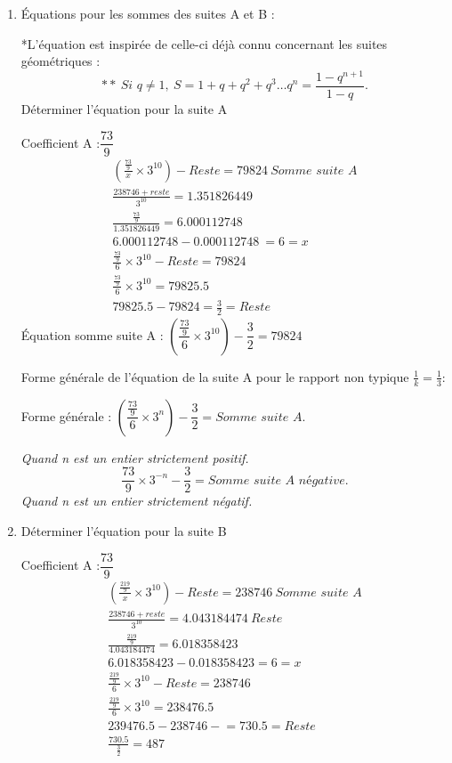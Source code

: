\documentclass[11pt,a4paper]{article}
\begin{document}
\begin{enumerate}[label=\arabic*.,leftmargin=*,itemsep=6pt]
\item Équations pour les sommes des suites A et B :

*L’équation est inspirée de celle-ci déjà connu concernant les suites géométriques :
\[
**\ \textit{Si }q\neq1,\ S=1+q+q^{2}+q^{3}\ldots q^{n}=\frac{1-q^{n+1}}{1-q}.
\]
Déterminer l’équation pour la suite A

Coefficient A :$\dfrac{73}{9}$
\begin{gather*}
\left(\frac{\frac{73}{9}}{x}\times3^{10}\right)-\textit{Reste}=79824\ \textit{Somme suite A}\\
\frac{238746+\textit{reste}}{3^{10}}=1.351826449\\
\frac{\frac{73}{9}}{1.351826449}=6.000112748\\
6.000112748-0.000112748\ =6=x\\
\frac{\frac{73}{9}}{6}\times3^{10}-\textit{Reste}=79824\\
\frac{\frac{73}{9}}{6}\times3^{10}=79825.5\\
79825.5-79824=\frac{3}{2}=\textit{Reste}
\end{gather*}
Équation somme suite A : $\left(\dfrac{\frac{73}{9}}{6}\times3^{10}\right)-\dfrac{3}{2}=79824$

Forme générale de l’équation de la suite A pour le rapport non typique $\frac{1}{k}=\frac{1}{3}$:

Forme générale : $\left(\dfrac{\frac{73}{9}}{6}\times3^{n}\right)-\dfrac{3}{2}=\textit{Somme suite A}.$

\textit{Quand n est un entier strictement positif.}
\[
\frac{73}{9}\times3^{-n}-\frac{3}{2}=\textit{Somme suite A négative}.
\]
\textit{Quand n est un entier strictement négatif.}

\item Déterminer l’équation pour la suite B

Coefficient A :$\dfrac{73}{9}$
\begin{gather*}
\left(\frac{\frac{219}{9}}{x}\times3^{10}\right)-\textit{Reste}=238746\ \textit{Somme suite A}\\
\frac{238746+\textit{reste}}{3^{10}}=4.043184474\ \textit{Reste}\\[6pt]
\frac{\frac{219}{9}}{4.043184474}=6.018358423\\[6pt]
6.018358423-0.018358423=6=x\\
\frac{\frac{219}{9}}{6}\times3^{10}-\textit{Reste}=238746\\
\frac{\frac{219}{9}}{6}\times3^{10}=238476.5\\
239476.5-238746-\!\!=730.5=\textit{Reste}\\
\frac{730.5}{\frac{3}{2}}=487
\end{gather*}


\end{enumerate}
\end{document}
